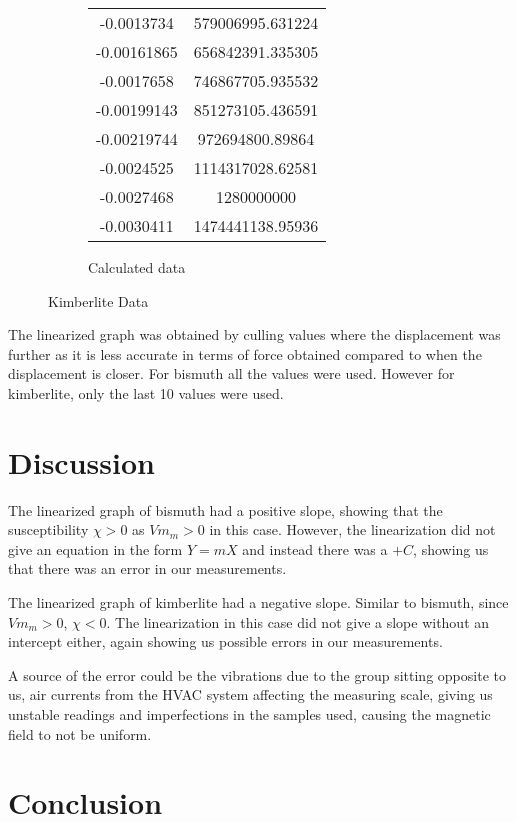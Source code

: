 \documentclass[12pt]{article}
\begin{document}
\begin{figure}
\begin{subfigure}{0.5\textwidth}
\begin{tabular}{|S[round-precision = 3, round-mode=figures, scientific-notation = true]|S[round-precision = 3,round-mode=figures, scientific-notation = true]|}
            -0.0013734             & 579006995.631224            \\
            -0.00161865            & 656842391.335305            \\
            -0.0017658             & 746867705.935532            \\
            -0.00199143            & 851273105.436591            \\
            -0.00219744            & 972694800.89864             \\
            -0.0024525             & 1114317028.62581            \\
            -0.0027468             & 1280000000                  \\
            -0.0030411             & 1474441138.95936            \\\hline
        \end{tabular}
        \caption{Calculated data}
    \end{subfigure}
    \caption{Kimberlite Data}
\end{figure}

The linearized graph was obtained by culling values where the displacement was further as it is less accurate in terms of force obtained compared to when the displacement is closer. For bismuth all the values were used. However for kimberlite, only the last 10 values were used.

\section{Discussion}
The linearized graph of bismuth had a positive slope, showing that the susceptibility $\chi > 0$ as $Vm_m > 0$ in this case. However, the linearization did not give an equation in the form $Y=mX$ and instead there was a $+C$, showing us that there was an error in our measurements.

The linearized graph of kimberlite had a negative slope. Similar to bismuth, since $Vm_m > 0$, $\chi < 0$. The linearization in this case did not give a slope without an intercept either, again showing us possible errors in our measurements.

A source of the error could be the vibrations due to the group sitting opposite to us, air currents from the HVAC system affecting the measuring scale, giving us unstable readings and imperfections in the samples used, causing the magnetic field to not be uniform.

\section{Conclusion}
\end{document}
